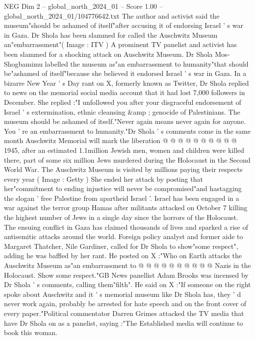 \begin{textsample}{NEG Dim 2 – global\_north\_2024\_01 – Score 1.00 – global\_north\_2024\_01/104776642.txt}  \label{ex:f2_neg_247}
The author and activist said the museum"should be ashamed of itself"after accusing it of endorsing Israel ' s war in Gaza.
Dr Shola has been slammed for called the Auschwitz Museum an"embarrassment"( Image : ITV ) A prominent TV panelist and activist has been slammed for a shocking attack on Auschwitz Museum.
Dr Shola Mos-Shogbamimu labelled the museum as"an embarrassment to humanity"that should be"ashamed of itself"because she believed it endorsed Israel ' s war in Gaza.
In a bizarre New Year ' s Day rant on X, formerly known as Twitter, Dr Shola replied to news on the memorial social media account that it had lost 7,000 followers in December.
She replied :"I unfollowed you after your disgraceful endorsement of Israel ' s extermination, ethnic cleansing \&amp ; genocide of Palestinians.
The museum should be ashamed of itself."Never again means never again for anyone.
You ' re an embarrassment to humanity."Dr Shola ' s comments come in the same month Auschwitz Memorial will mark the liberation @ @ @ @ @ @ @ @ @ @ 1945, after an estimated 1.1million Jewish men, women and children were killed there, part of some six million Jews murdered during the Holocaust in the Second World War.
The Auschwitz Museum is visited by millions paying their respects every year ( Image : Getty ) She ended her attack by posting that her"commitment to ending injustice will never be compromised"and hastagging the slogan ' free Palestine from apartheid Israel '.
Israel has been engaged in a war against the terror group Hamas after militants attacked on October 7 killing the highest number of Jews in a single day since the horrors of the Holocaust.
The ensuing conflict in Gaza has claimed thousands of lives and sparked a rise of antisemitic attacks around the world.
Foreign policy analyst and former aide to Margaret Thatcher, Nile Gardiner, called for Dr Shola to show"some respect", adding he was baffled by her rant.
He posted on X :"Who on Earth attacks the Auschwitz Museum as"an embarrassment to @ @ @ @ @ @ @ @ @ @ Nazis in the Holocaust.
Show some respect."GB News panellist Adam Brooks was incensed by Dr Shola ' s comments, calling them"filth".
He said on X :"If someone on the right spoke about Auschwitz and it ' s memorial museum like Dr Shola has, they ' d never work again, probably be arrested for hate speech and on the front cover of every paper."Political commentator Darren Grimes attacked the TV media that have Dr Shola on as a panelist, saying :"The Established media will continue to book this woman.

\end{textsample}
